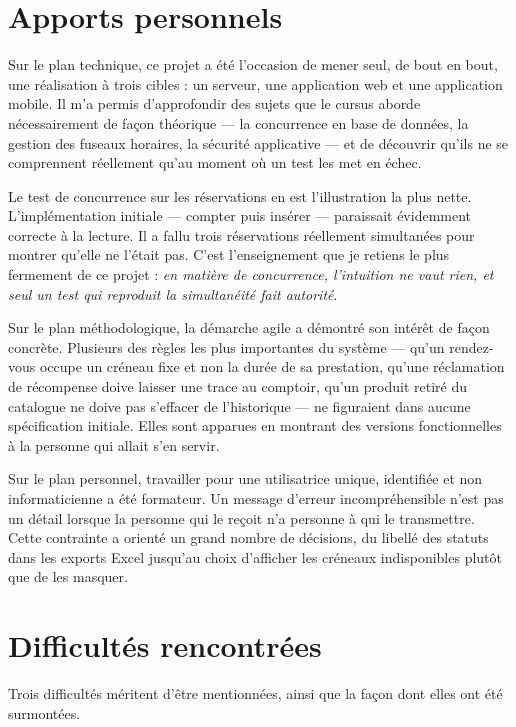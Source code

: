\section*{Apports personnels}

Sur le plan technique, ce projet a été l'occasion de mener seul, de bout en
bout, une réalisation à trois cibles : un serveur, une application web et une
application mobile. Il m'a permis d'approfondir des sujets que le cursus
aborde nécessairement de façon théorique --- la concurrence en base de données,
la gestion des fuseaux horaires, la sécurité applicative --- et de découvrir
qu'ils ne se comprennent réellement qu'au moment où un test les met en échec.

Le test de concurrence sur les réservations en est l'illustration la plus
nette. L'implémentation initiale --- compter puis insérer --- paraissait
évidemment correcte à la lecture. Il a fallu trois réservations réellement
simultanées pour montrer qu'elle ne l'était pas. C'est l'enseignement que je
retiens le plus fermement de ce projet : \emph{en matière de concurrence,
l'intuition ne vaut rien, et seul un test qui reproduit la simultanéité fait
autorité}.

Sur le plan méthodologique, la démarche agile a démontré son intérêt de façon
concrète. Plusieurs des règles les plus importantes du système --- qu'un
rendez-vous occupe un créneau fixe et non la durée de sa prestation, qu'une
réclamation de récompense doive laisser une trace au comptoir, qu'un produit
retiré du catalogue ne doive pas s'effacer de l'historique --- ne figuraient
dans aucune spécification initiale. Elles sont apparues en montrant des
versions fonctionnelles à la personne qui allait s'en servir.

Sur le plan personnel, travailler pour une utilisatrice unique, identifiée et
non informaticienne a été formateur. Un message d'erreur incompréhensible n'est
pas un détail lorsque la personne qui le reçoit n'a personne à qui le
transmettre. Cette contrainte a orienté un grand nombre de décisions, du
libellé des statuts dans les exports Excel jusqu'au choix d'afficher les
créneaux indisponibles plutôt que de les masquer.

\section*{Difficultés rencontrées}

Trois difficultés méritent d'être mentionnées, ainsi que la façon dont elles
ont été surmontées.

